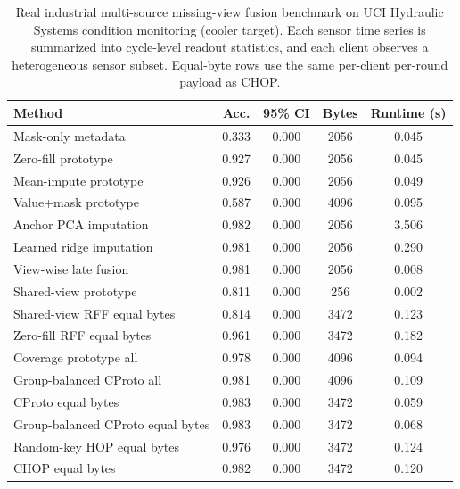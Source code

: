 \begin{table}[t]
\centering
\caption{Real industrial multi-source missing-view fusion benchmark on UCI Hydraulic Systems condition monitoring (cooler target). Each sensor time series is summarized into cycle-level readout statistics, and each client observes a heterogeneous sensor subset. Equal-byte rows use the same per-client per-round payload as CHOP.}
\label{tab:if-hydraulic-fusion}
\scriptsize
\setlength{\tabcolsep}{3pt}
\renewcommand{\arraystretch}{0.94}
\begin{tabular}{lcccc}
\toprule
Method & Acc. & 95\% CI & Bytes & Runtime (s) \\
\midrule
Mask-only metadata & 0.333 & 0.000 & 2056 & 0.045 \\
Zero-fill prototype & 0.927 & 0.000 & 2056 & 0.045 \\
Mean-impute prototype & 0.926 & 0.000 & 2056 & 0.049 \\
Value+mask prototype & 0.587 & 0.000 & 4096 & 0.095 \\
Anchor PCA imputation & 0.982 & 0.000 & 2056 & 3.506 \\
Learned ridge imputation & 0.981 & 0.000 & 2056 & 0.290 \\
View-wise late fusion & 0.981 & 0.000 & 2056 & 0.008 \\
Shared-view prototype & 0.811 & 0.000 & 256 & 0.002 \\
Shared-view RFF equal bytes & 0.814 & 0.000 & 3472 & 0.123 \\
Zero-fill RFF equal bytes & 0.961 & 0.000 & 3472 & 0.182 \\
Coverage prototype all & 0.978 & 0.000 & 4096 & 0.094 \\
Group-balanced CProto all & 0.981 & 0.000 & 4096 & 0.109 \\
CProto equal bytes & 0.983 & 0.000 & 3472 & 0.059 \\
Group-balanced CProto equal bytes & 0.983 & 0.000 & 3472 & 0.068 \\
Random-key HOP equal bytes & 0.976 & 0.000 & 3472 & 0.124 \\
CHOP equal bytes & 0.982 & 0.000 & 3472 & 0.120 \\
\bottomrule
\end{tabular}
\end{table}

